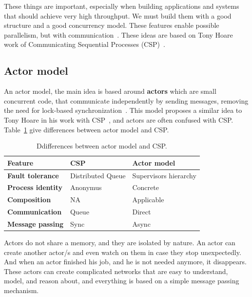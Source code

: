 \noindent
These things are important, especially when building applications and systems that should achieve very high throughput. We must build them with a good structure and a good concurrency model. These features enable possible parallelism, but with communication~\cite{Pike}. These ideas are based on Tony Hoare work of Communicating Sequential Processes (CSP)~\cite{Hoare78}.

\subsection{Actor model}\label{sec:actor_model}
%
An actor model, the main idea is based around \textbf{actors} which are small concurrent code, that communicate independently by sending messages, removing the need for lock-based synchronization~\cite{Hewitt}. This model proposes a similar idea to Tony Hoare in his work with CSP~\cite{Hoare78}, and actors are often confused with CSP. Table~\ref{tab:table6} give differences between actor model and CSP.

\begin{table}[h!]
	\begin{center}
		\begin{tabular}{l|l|l}
			\textbf{Feature} & \textbf{CSP} & \textbf{Actor model}\\
			\hline
			\textbf{Fault tolerance} & Distributed Queue &  Supervisors hierarchy \\
			\textbf{Process identity} & Anonymus & Concrete \\
			\textbf{Composition} & NA & Applicable \\
			\textbf{Communication} & Queue & Direct \\
			\textbf{Message passing} & Sync & Async\\
		\end{tabular}
	\end{center}
	\vspace{-0.5cm}
	\caption{Ddifferences between actor model and CSP.}
	\label{tab:table6}
\end{table}

Actors do not share a memory, and they are isolated by nature. An actor can create another actor/s and even watch on them in case they stop unexpectedly. And when an actor finished his job, and he is not needed anymore, it disappears. These actors can create complicated networks that are easy to understand, model, and reason about, and everything is based on a simple message passing mechanism. 

